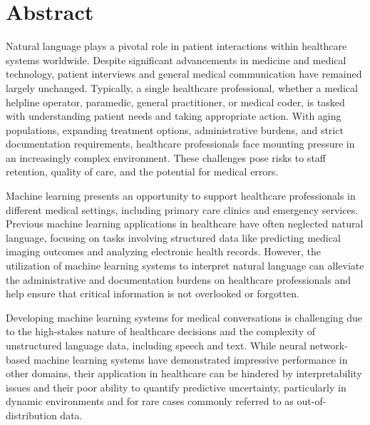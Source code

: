 
\chapter[abstract]{Abstract}

Natural language plays a pivotal role in patient interactions within healthcare systems worldwide. Despite significant advancements in medicine and medical technology, patient interviews and general medical communication have remained largely unchanged. Typically, a single healthcare professional, whether a medical helpline operator, paramedic, general practitioner, or medical coder, is tasked with understanding patient needs and taking appropriate action. With aging populations, expanding treatment options, administrative burdens, and strict documentation requirements, healthcare professionals face mounting pressure in an increasingly complex environment. These challenges pose risks to staff retention, quality of care, and the potential for medical errors.

Machine learning presents an opportunity to support healthcare professionals in different medical settings, including primary care clinics and emergency services. Previous machine learning applications in healthcare have often neglected natural language, focusing on tasks involving structured data like predicting medical imaging outcomes and analyzing electronic health records. However, the utilization of machine learning systems to interpret natural language can alleviate the administrative and documentation burdens on healthcare professionals and help ensure that critical information is not overlooked or forgotten.

Developing machine learning systems for medical conversations is challenging due to the high-stakes nature of healthcare decisions and the complexity of unstructured language data, including speech and text. While neural network-based machine learning systems have demonstrated impressive performance in other domains, their application in healthcare can be hindered by interpretability issues and their poor ability to quantify predictive uncertainty, particularly in dynamic environments and for rare cases commonly referred to as out-of-distribution data.

